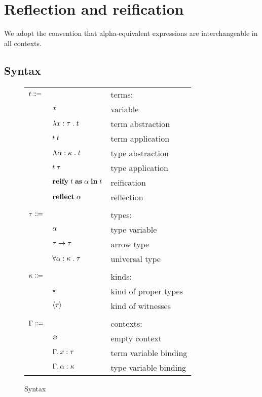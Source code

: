 \section{Reflection and reification}

  We adopt the convention that alpha-equivalent expressions are interchangeable in all contexts.

  \subsection{Syntax}

    \begin{figure}[H]
      \begin{center}
        \begin{tabular}{l l l}
          $t \Coloneqq$ & & terms: \\
          & $x$ & variable \\
          & $\lambda x : \tau \; . \; t$ & term abstraction \\
          & $t \; t$ & term application \\
          & $\Lambda \alpha : \kappa \; . \; t$ & type abstraction \\
          & $t \; \tau$ & type application \\
          & $\textbf{reify} \; t \; \textbf{as} \; \alpha \; \textbf{in} \; t$ & reification \\
          & $\textbf{reflect} \; \alpha$ & reflection \\
          \\
          $\tau \Coloneqq$ & & types: \\
          & $\alpha$ & type variable \\
          & $\tau \rightarrow \tau$ & arrow type \\
          & $\forall \alpha : \kappa \; . \; \tau$ & universal type \\
          \\
          $\kappa \Coloneqq$ & & kinds: \\
          & $\star$ & kind of proper types \\
          & $\left\langle \tau \right\rangle$ & kind of witnesses \\
          \\
          $\Gamma \Coloneqq$ & & contexts: \\
          & $\varnothing$ & empty context \\
          & $\Gamma, x : \tau$ & term variable binding \\
          & $\Gamma, \alpha : \kappa$ & type variable binding \\
        \end{tabular}
      \end{center}

      \caption{Syntax}\label{fig:refl_syntax}
    \end{figure}

